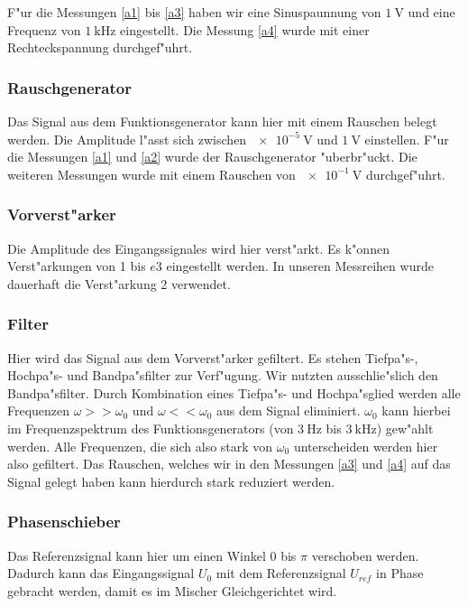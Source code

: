 \documentclass{scrartcl}
\begin{document}
F"ur die Messungen \ref{a1} bis \ref{a3} haben wir eine Sinuspaunnung von $\SI{1}{\volt}$ und eine Frequenz von $\SI{1}{\kilo\hertz}$ eingestellt.
Die Messung \ref{a4} wurde mit einer Rechteckspannung durchgef"uhrt.

\subsubsection{Rauschgenerator}

Das Signal aus dem Funktionsgenerator kann hier mit einem Rauschen belegt werden.
Die Amplitude l"asst sich zwischen $\SI{e-5}{\volt}$ und $\SI{1}{\volt}$ einstellen.
F"ur die Messungen \ref{a1} und \ref{a2} wurde der Rauschgenerator "uberbr"uckt. Die weiteren Messungen wurde mit einem Rauschen von $\SI{e-1}{\volt}$ durchgef"uhrt.

\subsubsection{Vorverst"arker}

Die Amplitude des Eingangssignales wird hier verst"arkt. Es k"onnen Verst"arkungen von 1 bis $e3$ eingestellt werden.
In unseren Messreihen wurde dauerhaft die Verst"arkung 2 verwendet.

\subsubsection{Filter}

Hier wird das Signal aus dem Vorverst"arker gefiltert. Es stehen Tiefpa"s-, Hochpa"s- und Bandpa"sfilter zur Verf"ugung.
Wir nutzten ausschlie"slich den Bandpa"sfilter. Durch Kombination eines Tiefpa"s- und Hochpa"sglied werden alle Frequenzen
$\omega >> \omega_0$ und $\omega << \omega_0$ aus dem Signal eliminiert.
$\omega_0$ kann hierbei im Frequenzspektrum des Funktionsgenerators (von $\SI{3}{\hertz}$ bis $\SI{3}{\kilo\hertz}$) gew"ahlt werden.
Alle Frequenzen, die sich also stark von $\omega_0$ unterscheiden werden hier also gefiltert.
Das Rauschen, welches wir in den Messungen \ref{a3} und \ref{a4} auf das Signal gelegt haben kann hierdurch stark reduziert werden.

\subsubsection{Phasenschieber}

Das Referenzsignal kann hier um einen Winkel $0$ bis $\pi$ verschoben werden.
Dadurch kann das Eingangssignal $U_0$ mit dem Referenzsignal $U_{ref}$ in Phase gebracht werden,
damit es im Mischer Gleichgerichtet wird.
\end{document}
